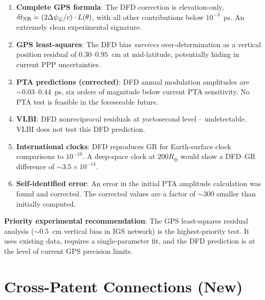 \documentclass[aps,prd,twocolumn,superscriptaddress,nofootinbib]{revtex4-2}
\newcommand{\deltaT}{\delta t_{\rm NR}}
\begin{document}
\begin{enumerate}
\item \textbf{Complete GPS formula}: The DFD correction is elevation-only,
      $\deltaT = (2\Delta\psi_\oplus/c)\cdot L(\theta)$, with all other
      contributions below $10^{-3}$~ps. An extremely clean experimental signature.

\item \textbf{GPS least-squares}: The DFD bias \emph{survives} over-determination
      as a vertical position residual of $0.30$--$0.95$~cm at mid-latitude,
      potentially hiding in current PPP uncertainties.

\item \textbf{PTA predictions (corrected)}: DFD annual modulation amplitudes
      are $\sim 0.03$--$0.44$~ps, six orders of magnitude below current
      PTA sensitivity. No PTA test is feasible in the foreseeable future.

\item \textbf{VLBI}: DFD nonreciprocal residuals at yoctosecond level --
      undetectable. VLBI does not test this DFD prediction.

\item \textbf{International clocks}: DFD reproduces GR for Earth-surface
      clock comparisons to $10^{-19}$. A deep-space clock at $200R_\oplus$
      would show a DFD--GR difference of $\sim 3.5\times10^{-14}$.

\item \textbf{Self-identified error}: An error in the initial PTA amplitude
      calculation was found and corrected. The corrected values are a factor
      of $\sim 300$ smaller than initially computed.
\end{enumerate}

\textbf{Priority experimental recommendation}: The GPS least-squares residual
analysis ($\sim 0.5$~cm vertical bias in IGS network) is the highest-priority
test. It uses existing data, requires a single-parameter fit, and the DFD
prediction is at the level of current GPS precision limits.

\section*{Cross-Patent Connections (New)}
\end{document}
